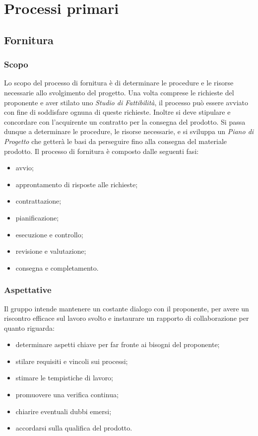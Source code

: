 \section{Processi primari}
\subsection{Fornitura}
\subsubsection{Scopo}
Lo scopo del processo di fornitura è di determinare le procedure e le risorse necessarie allo svolgimento del progetto. Una volta comprese le richieste del proponente e aver stilato uno \textit{Studio di Fattibilità}, il processo può essere avviato con fine di soddisfare ognuna di queste richieste. Inoltre si deve stipulare e concordare con l'acquirente un contratto per la consegna del prodotto. Si passa dunque a determinare le procedure, le risorse necessarie, e si sviluppa un \textit{Piano di Progetto} che getterà le basi da perseguire fino alla consegna del materiale prodotto.
	Il processo di fornitura è composto dalle seguenti fasi:
	\begin{itemize}
		\item avvio;
		\item approntamento di risposte alle richieste;
		\item contrattazione;
		\item pianificazione;
		\item esecuzione e controllo;
		\item revisione e valutazione;
		\item consegna e completamento.
	\end{itemize}
	\subsubsection{Aspettative}
	Il gruppo intende mantenere un costante dialogo con il proponente, per avere un riscontro efficace sul lavoro svolto e instaurare un rapporto di collaborazione per quanto riguarda:
	\begin{itemize}
		\item determinare aspetti chiave per far fronte ai bisogni del proponente;
		\item stilare requisiti e vincoli sui processi;
		\item stimare le tempistiche di lavoro;
		\item promuovere una verifica continua;
		\item chiarire eventuali dubbi emersi;
		\item accordarsi sulla qualifica del prodotto.
	\end{itemize}
